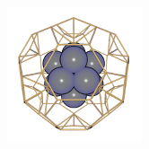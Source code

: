 \documentclass[a4paper,12pt]{article}
\begin{document}
\begin{center}
\includegraphics[scale=0.58]{figures/gallery/g19_sm.png}\
\end{center}



\newpage




\end{document}
